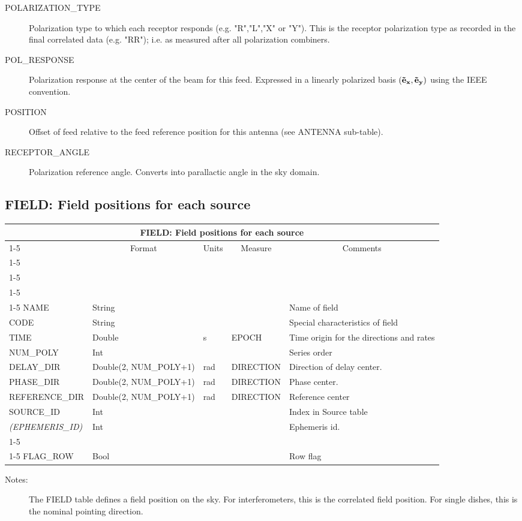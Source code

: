 \documentclass{article}
\newcommand{\defline}[1]{\cline{1-5}
\multicolumn{5}{|l|}{#1} \\
\cline{1-5}}
\newcommand{\definetable}[2]
{
	\vfill\newpage
	\subsection{#1}
        \vspace{0.15in}
        \small
	\begin{tabular}{|l|p{1.25in}|l|p{.9in}|p{1.4in}|}
	\hline
	\multicolumn{5}{|c|}{\bf #1}\\ 
	\cline{1-5}
        \multicolumn{1}{|c|}{Name}&\multicolumn{1}{|c|}{Format}&
        \multicolumn{1}{|c|}{Units}&\multicolumn{1}{|c|}{Measure}&
        \multicolumn{1}{|c|}{Comments}\\
        \cline{1-5}
        #2
        \hline
	\end{tabular}
}
\begin{document}
\begin{itemize}
\begin{description}
\item[POLARIZATION\_TYPE] Polarization type to which each receptor
responds (e.g. "R","L","X" or "Y"). This is the receptor polarization
type as recorded in the final correlated data (e.g. "RR"); i.e. as
measured after all polarization combiners.

\item[POL\_RESPONSE] Polarization response at the center of the beam
for this feed. Expressed in a linearly polarized basis $({\bf \vec
e_x}, {\bf \vec e_y})$ using the IEEE convention.

\item[POSITION] Offset of feed relative to the feed reference position
for this antenna (see ANTENNA sub-table).

\item[RECEPTOR\_ANGLE] Polarization reference angle. Converts into
parallactic angle in the sky domain.

\end{description}

\definetable{FIELD: Field positions for each source}{
\defline{\bf Columns}
\defline{\em Key}
\defline{\em Data}  
NAME &       String &    &      & Name of field \\
CODE &       String &    &      & Special characteristics of field \\
TIME &   Double  &      s  & EPOCH & Time origin for the directions and rates\\
NUM\_POLY & Int & & & Series order \\
DELAY\_DIR    &      Double(2, NUM\_POLY+1)  &      rad   &     DIRECTION & Direction of delay center. \\
PHASE\_DIR    &      Double(2, NUM\_POLY+1)  &      rad   &     DIRECTION & Phase center. \\
REFERENCE\_DIR &      Double(2, NUM\_POLY+1)  &      rad   &     DIRECTION & Reference center \\
SOURCE\_ID &      Int    &    &      & Index in Source table\\
{\it (EPHEMERIS\_ID)} &   Int    &    &      & Ephemeris id.\\
\defline{Flags}
FLAG\_ROW & Bool & & & Row flag\\
}
\begin{description}

\item[Notes:] The FIELD table defines a field position on the sky. For
interferometers, this is the correlated field position. For single dishes,
this is the nominal pointing direction.


\end{description}
\end{itemize}
\end{document}
